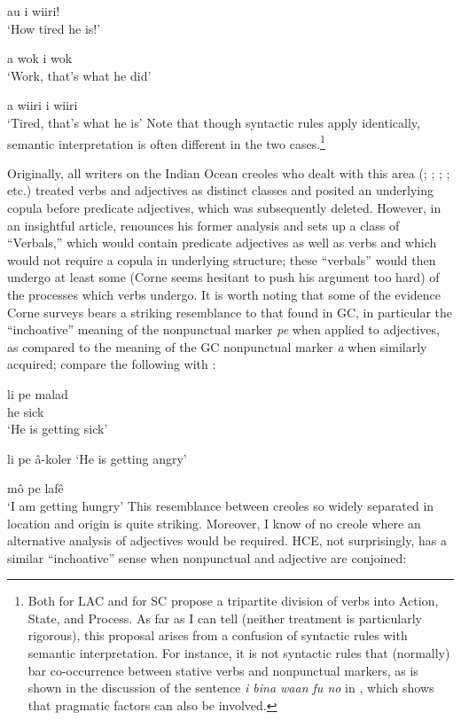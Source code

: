 \ea\label{ex:2:68}
{au} {i} {wiiri!}\\
\glt `How tired he is!'
\z

\ea\label{ex:2:69}
 {a} {wok} {i} {wok}\\
\glt `Work, that's what he did'
\z

\ea\label{ex:2:70}
{a} {wiiri} {i} {wiiri}\\
\glt `Tired, that's what he is' 
\z
Note that though syntactic rules apply identically, semantic interpre\-tation is often different in the two cases.\footnote{Both \citet{Christie1976} for LAC and \citet{Corne1981} for SC propose a tripartite division of verbs into Action, State, and Process. As far as I can tell (neither treatment is particularly rigorous), this proposal arises from a confusion of syntactic rules with semantic interpretation. For instance, it is not syntactic rules that (normally) bar co-occurrence between stative verbs and nonpunctual markers, as is shown in the discussion of the sentence \textit{i bina waan fu no} in \citet[38]{Bickerton1975}, which shows that pragmatic factors can also be involved.}

Originally, all writers on the Indian Ocean creoles who dealt with this area (\citealt{Baker1972}; \citealt{Corne1973,Corne1977}; \citealt{Papen1975,Papen1978}; \citealt{Bollee1977}; etc.) treated verbs and adjectives as distinct classes and posited an underlying copula before predicate adjectives, which was subsequently deleted. However, in an insightful article, \citet{Corne1981} renounces his former analysis and sets up a class of ``Verbals,'' which would contain predicate adjectives as well as verbs and which would not require a copula in underlying structure; these ``verbals'' would then undergo at least some (Corne seems hesitant to push his argument too hard) of the processes which verbs undergo. It is worth noting that some of the evidence Corne surveys bears a striking resemblance to that found in GC, in particular the ``inchoative'' meaning of the nonpunctual marker \textit{pe} when applied to adjectives, as compared to the meaning of the GC nonpunctual marker \textit{a} when similarly acquired; compare the following with :

\ea\label{ex:2:71}
 \gll li pe malad\\
he {\ASP} sick\\
\glt `He is getting sick'
\z

\ea\label{ex:2:72}
 li pe {\^a}-koler
\glt `He is getting angry'
\z

\ea\label{ex:2:73}
 m{\^o} pe laf{\^e}\\
\glt `I am getting hungry'
\z
This resemblance between creoles so widely separated in location and origin is quite striking. Moreover, I know of no creole where an alterna\-tive analysis of adjectives would be required. HCE, not surprisingly, has a similar ``inchoative'' sense when nonpunctual and adjective are conjoined:

